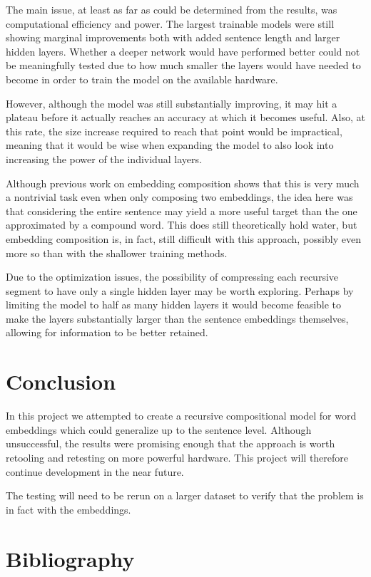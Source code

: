 \documentclass[11pt]{article}
\begin{document}
The main issue, at least as far as could be determined from the results, was computational efficiency and power. The largest trainable models were still showing marginal improvements both with added sentence length and larger hidden layers. Whether a deeper network would have performed better could not be meaningfully tested due to how much smaller the layers would have needed to become in order to train the model on the available hardware.

However, although the model was still substantially improving, it may hit a plateau before it actually reaches an accuracy at which it becomes useful. Also, at this rate, the size increase required to reach that point would be impractical, meaning that it would be wise when expanding the model to also look into increasing the power of the individual layers.

Although previous work on embedding composition shows that this is very much a nontrivial task even when only composing two embeddings, the idea here was that considering the entire sentence may yield a more useful target than the one approximated by a compound word. This does still theoretically hold water, but embedding composition is, in fact, still difficult with this approach, possibly even more so than with the shallower training methods.

Due to the optimization issues, the possibility of compressing each recursive segment to have only a single hidden layer may be worth exploring. Perhaps by limiting the model to half as many hidden layers it would become feasible to make the layers substantially larger than the sentence embeddings themselves, allowing for information to be better retained.

\section{Conclusion}

In this project we attempted to create a recursive compositional model for word embeddings which could generalize up to the sentence level. Although unsuccessful, the results were promising enough that the approach is worth retooling and retesting on more powerful hardware. This project will therefore continue development in the near future.

The testing will need to be rerun on a larger dataset to verify that the problem is in fact with the embeddings.

\section{Bibliography}


%
%

\end{document}
